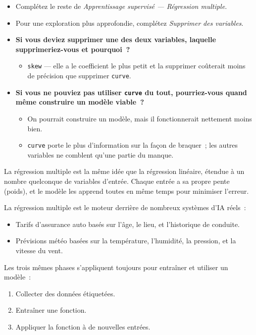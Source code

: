 \documentclass[12pt,a4paper]{article}
\begin{document}
\begin{activitybox}
  \begin{itemize}
    \item Complétez le reste de \emph{Apprentissage supervisé — Régression multiple}.
    \item Pour une exploration plus approfondie, complétez \emph{Supprimer des variables}.
  \end{itemize}
\end{activitybox}

\begin{thinkbox}
  \begin{itemize}
    \item \textbf{Si vous deviez supprimer une des deux variables, laquelle supprimeriez-vous et pourquoi~?}
    \begin{itemize}
      \item \texttt{skew} — elle a le coefficient le plus petit et la supprimer coûterait moins de précision que supprimer \texttt{curve}.
    \end{itemize}
    \item \textbf{Si vous ne pouviez pas utiliser \texttt{curve} du tout, pourriez-vous quand même construire un modèle viable~?}
    \begin{itemize}
      \item On pourrait construire un modèle, mais il fonctionnerait nettement moins bien.
      \item \texttt{curve} porte le plus d'information sur la façon de braquer~; les autres variables ne comblent qu'une partie du manque.
    \end{itemize}
  \end{itemize}
\end{thinkbox}

\begin{keypointbox}
  La régression multiple est la même idée que la régression linéaire, étendue à un nombre quelconque de variables d'entrée. Chaque entrée a sa propre pente (poids), et le modèle les apprend toutes en même temps pour minimiser l'erreur.

  \vspace{0.4em}
  La régression multiple est le moteur derrière de nombreux systèmes d'IA réels~:
  \begin{itemize}
    \item Tarifs d'assurance auto basés sur l'âge, le lieu, et l'historique de conduite.
    \item Prévisions météo basées sur la température, l'humidité, la pression, et la vitesse du vent.
  \end{itemize}

  Les trois mêmes phases s'appliquent toujours pour entraîner et utiliser un modèle~:
  \begin{enumerate}
    \item Collecter des données étiquetées.
    \item Entraîner une fonction.
    \item Appliquer la fonction à de nouvelles entrées.
  \end{enumerate}
\end{keypointbox}
\end{document}
